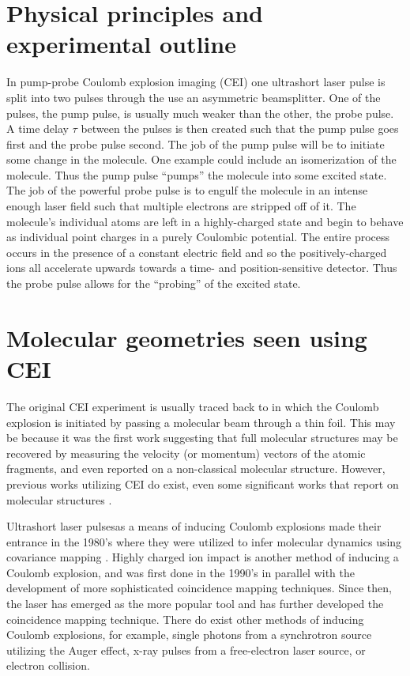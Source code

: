\section{Physical principles and experimental outline} \label{sec:CEIphysics}
In pump-probe Coulomb explosion imaging (CEI) one ultrashort laser pulse is split into two pulses through the use an asymmetric beamsplitter. One of the pulses, the pump pulse, is usually much weaker than the other, the probe pulse. A time delay $\tau$ between the pulses is then created such that the pump pulse goes first and the probe pulse second. The job of the pump pulse will be to initiate some change in the molecule. One example could include an isomerization of the molecule. Thus the pump pulse ``pumps'' the molecule into some excited state. The job of the powerful probe pulse is to engulf the molecule in an intense enough laser field such that multiple electrons are stripped off of it. The molecule's individual atoms are left in a highly-charged state and begin to behave as individual point charges in a purely Coulombic potential. The entire process occurs in the presence of a constant electric field and so the positively-charged ions all accelerate upwards towards a time- and position-sensitive detector. Thus the probe pulse allows for the ``probing'' of the excited state.

\section{Molecular geometries seen using CEI}
The original CEI experiment is usually traced back to \citet{Vager89} in which the Coulomb explosion is initiated by passing a molecular beam through a thin foil. This may be because it was the first work suggesting that full molecular structures may be recovered by measuring the velocity (or momentum) vectors of the atomic fragments, and even reported on a non-classical molecular structure. However, previous works utilizing CEI do exist, even some significant works that report on molecular structures \citep{Kanter79}.

Ultrashort laser pulses\footnotemark as a means of inducing Coulomb explosions made their entrance in the 1980's where they were utilized to infer molecular dynamics using covariance mapping \citep{Frasinski89}. Highly charged ion impact is another method of inducing a Coulomb explosion, and was first done in the 1990's in parallel with the development of more sophisticated coincidence mapping techniques. Since then, the laser has emerged as the more popular tool and has further developed the coincidence mapping technique. There do exist other methods of inducing Coulomb explosions, for example, single photons from a synchrotron source utilizing the Auger effect, x-ray pulses from a free-electron laser source, or electron collision.

